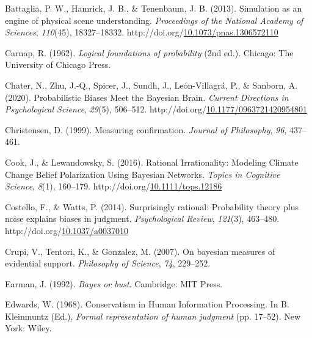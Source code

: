\documentclass[10pt, letterpaper]{article}
\newenvironment{CSLReferences}%
  {}%
  {\par}
\begin{document}
\hypertarget{refs}{}
\begin{CSLReferences}
\leavevmode{}%
Battaglia, P. W., Hamrick, J. B., \& Tenenbaum, J. B. (2013). Simulation
as an engine of physical scene understanding. \emph{Proceedings of the
National Academy of Sciences}, \emph{110}(45), 18327--18332.
http://doi.org/\href{https://doi.org/10.1073/pnas.1306572110}{10.1073/pnas.1306572110}

\leavevmode{}%
Carnap, R. (1962). \emph{Logical foundations of probability} (2nd ed.).
Chicago: The University of Chicago Press.

\leavevmode{}%
Chater, N., Zhu, J.-Q., Spicer, J., Sundh, J., León-Villagrá, P., \&
Sanborn, A. (2020). Probabilistic {Biases} {Meet} the {Bayesian}
{Brain}. \emph{Current Directions in Psychological Science},
\emph{29}(5), 506--512.
http://doi.org/\href{https://doi.org/10.1177/0963721420954801}{10.1177/0963721420954801}

\leavevmode{}%
Christensen, D. (1999). Measuring confirmation. \emph{Journal of
Philosophy}, \emph{96}, 437--461.

\leavevmode{}%
Cook, J., \& Lewandowsky, S. (2016). Rational {Irrationality}:
{Modeling} {Climate} {Change} {Belief} {Polarization} {Using} {Bayesian}
{Networks}. \emph{Topics in Cognitive Science}, \emph{8}(1), 160--179.
http://doi.org/\href{https://doi.org/10.1111/tops.12186}{10.1111/tops.12186}

\leavevmode{}%
Costello, F., \& Watts, P. (2014). Surprisingly rational: {Probability}
theory plus noise explains biases in judgment. \emph{Psychological
Review}, \emph{121}(3), 463--480.
http://doi.org/\href{https://doi.org/10.1037/a0037010}{10.1037/a0037010}

\leavevmode{}%
Crupi, V., Tentori, K., \& Gonzalez, M. (2007). On bayesian measures of
evidential support. \emph{Philosophy of Science}, \emph{74}, 229--252.

\leavevmode{}%
Earman, J. (1992). \emph{Bayes or bust}. Cambridge: MIT Press.

\leavevmode{}%
Edwards, W. (1968). Conservatism in {Human} {Information} {Processing}.
In B. Kleinmuntz (Ed.), \emph{Formal representation of human judgment}
(pp. 17--52). New York: Wiley.


\end{CSLReferences}
\end{document}
